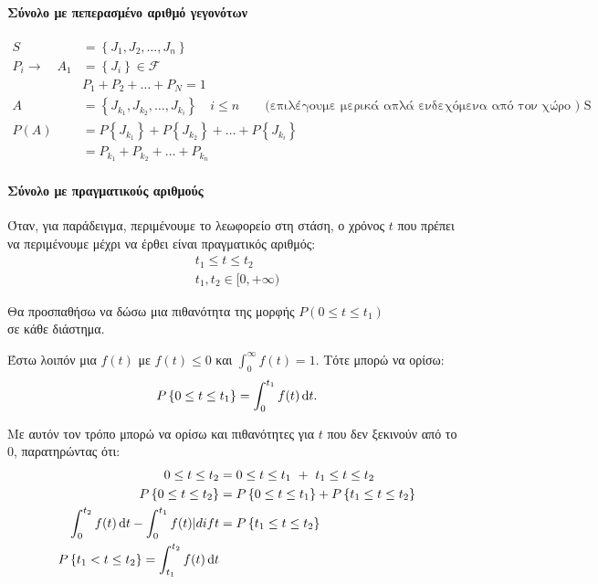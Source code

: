 \documentclass[11pt,a4paper,notitlepage,fleqn,final]{article}
\begin{document}
	\paragraph{Σύνολο με πεπερασμένο αριθμό γεγονότων}
	\begin{align*}
		S &= \left\lbrace J_1,J_2,\dots,J_n \right\rbrace \\
		P_i \to \quad A_1 &= 
		\left\lbrace J_i \right\rbrace \in \mathcal F \\
		& P_1+P_2+\dots+P_N = 1 \\
		A &= \left\lbrace J_{k_1},J_{k_2},\dots,J_{k_i} \right\rbrace
		\quad i \leq n \qquad \text{(επιλέγουμε μερικά
			απλά ενδεχόμενα από τον χώρο ) S} \\
		P(A) &= P\left\lbrace J_{k_1} \right\rbrace +
		P\left\lbrace J_{k_2} \right\rbrace + \dots +
		P\left\lbrace J_{k_i} \right\rbrace \\ &=
		P_{k_1} + P_{k_2} + \dots + P_{k_n}
	\end{align*}
	
	\paragraph{Σύνολο με πραγματικούς αριθμούς}
	Όταν, για παράδειγμα, περιμένουμε το λεωφορείο στη στάση, ο χρόνος
	\( t \) που πρέπει να περιμένουμε μέχρι να έρθει είναι πραγματικός
	αριθμός:
	\begin{gather*}
		t_1 \leq t \leq t_2 \\ t_1,t_2 \in [0,+\infty)
	\end{gather*}
	
	Θα προσπαθήσω να δώσω μια πιθανότητα της μορφής 
	\( P(0 \leq t \leq t_1) \)
	\\σε κάθε διάστημα.
	
	Έστω λοιπόν μια \underline{\( f(t) \)} με \( f(t) \leq 0 \) και
	\( \displaystyle \int_0^\infty f(t) = 1 \). Τότε μπορώ να ορίσω:
	\[
	P\left\lbrace 0 \leq t \leq t_1 \right\rbrace =
	\int_0^{t_1} f(t)\mathop{}\!\mathrm{d} t.
	\]
	
	Με αυτόν τον τρόπο μπορώ να ορίσω και πιθανότητες για \( t \) που
	δεν ξεκινούν από το 0, παρατηρώντας ότι:
	\begin{align*}
	0 \leq t \leq t_2 &= 0 \leq t \leq t_1 \ + \ t_1\leq t \leq t_2 \\
	P\left\lbrace 0\leq t \leq t_2 \right\rbrace &=
	P\left\lbrace 0 \leq t \leq t_1 \right\rbrace + P\left\lbrace 
	t_1 \leq t \leq t_2 \right\rbrace \\
	\int_0^{t_2} f(t)\mathop{}\!\mathrm{d} t - \int_0^{t_1} f(t)|dif t &=
	P\left\lbrace t_1 \leq t \leq t_2 \right\rbrace \\
	P\left\lbrace t_1<t\leq t_2 \right\rbrace =
	\int_{t_1}^{t_2} f(t)\mathop{}\!\mathrm{d} t
	\end{align*}
	
\end{document}

